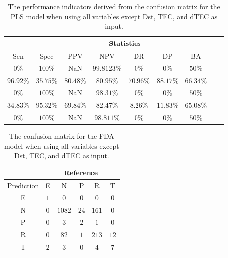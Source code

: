 \begin{table}[!ht]
	\centering
	\begin{tabular}{|c|c|c|c|c|c|c|c|c|}
		\hline
		 & \multicolumn{7}{c|}{Statistics} \\ \hline
		Sen & Spec & PPV & NPV & DR & DP & BA \\ \hline
		$0\%$ & $100\%$ & NaN & $99.8123\%$ & $0\%$ & $0\%$ & $50\%$ \\ \hline
		$96.92\%$ & $35.75\%$ & $80.48\%$ & $80.95\%$ & $70.96\%$ & $88.17\%$ & $66.34\%$ \\ \hline
		$0\%$ & $100\%$ & NaN & $98.31\%$ & $0\%$ & $0\%$ & $50\%$ \\ \hline
		$34.83\%$ & $95.32\%$ & $69.84\%$ & $82.47\%$ & $8.26\%$ & $11.83\%$ & $65.08\%$ \\ \hline
		$0\%$ & $100\%$ & NaN & $98.811\%$ & $0\%$ & $0\%$ & $50\%$ \\ \hline
	\end{tabular}
	\caption{The performance indicators derived from the confusion matrix for the PLS model when using all variables except Dst, TEC, and dTEC as input.}
	\label{tab:cs:noTEC:pls}
\end{table}

\begin{table}[!ht]
	\centering
	\begin{tabular}{|c|c|c|c|c|c|}
		\hline
		 & \multicolumn{5}{|c|}{Reference} \\ \hline
		 Prediction & E & N & P & R & T \\ \hline
		 E & $1$ & $0$ & $0$ & $0$ & $0$ \\ \hline
		 N & $0$ & $1082$ & $24$ & $161$ & $0$ \\ \hline
		 P & $0$ & $3$ & $2$ & $1$ & $0$ \\ \hline
		 R & $0$ & $82$ & $1$ & $213$ & $12$ \\ \hline
		 T & $2$ & $3$ & $0$ & $4$ & $7$ \\ \hline
	\end{tabular}
	\caption{The confusion matrix for the FDA model when using all variables except Dst, TEC, and dTEC as input.}
	\label{tab:cm:noTEC:fda}
\end{table}

